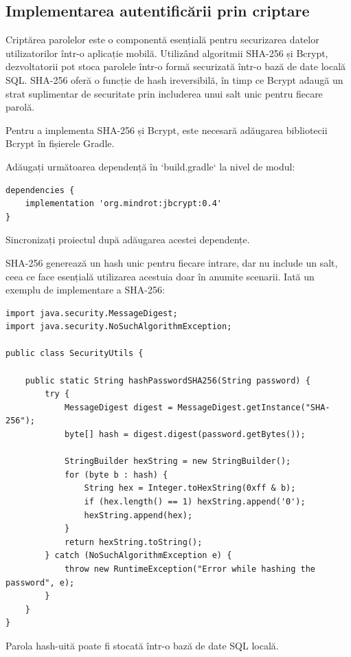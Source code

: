 \documentclass[runningheads]{llncs}
\begin{document}
\subsection{Implementarea autentificării prin criptare}

Criptărea parolelor este o componentă esențială pentru securizarea datelor utilizatorilor într-o aplicație mobilă. Utilizând algoritmii SHA-256 și Bcrypt, dezvoltatorii pot stoca parolele într-o formă securizată într-o bază de date locală SQL. SHA-256 oferă o funcție de hash ireversibilă, în timp ce Bcrypt adaugă un strat suplimentar de securitate prin includerea unui salt unic pentru fiecare parolă.

Pentru a implementa SHA-256 și Bcrypt, este necesară adăugarea bibliotecii Bcrypt în fișierele Gradle. 

Adăugați următoarea dependență în `build.gradle` la nivel de modul:

\begin{lstlisting}
dependencies {
    implementation 'org.mindrot:jbcrypt:0.4'
}
\end{lstlisting}

Sincronizați proiectul după adăugarea acestei dependențe.

SHA-256 generează un hash unic pentru fiecare intrare, dar nu include un salt, ceea ce face esențială utilizarea acestuia doar în anumite scenarii. Iată un exemplu de implementare a SHA-256:

\begin{lstlisting}
import java.security.MessageDigest;
import java.security.NoSuchAlgorithmException;

public class SecurityUtils {

    public static String hashPasswordSHA256(String password) {
        try {
            MessageDigest digest = MessageDigest.getInstance("SHA-256");
            byte[] hash = digest.digest(password.getBytes());

            StringBuilder hexString = new StringBuilder();
            for (byte b : hash) {
                String hex = Integer.toHexString(0xff & b);
                if (hex.length() == 1) hexString.append('0');
                hexString.append(hex);
            }
            return hexString.toString();
        } catch (NoSuchAlgorithmException e) {
            throw new RuntimeException("Error while hashing the password", e);
        }
    }
}
\end{lstlisting}

Parola hash-uită poate fi stocată într-o bază de date SQL locală.
\end{document}
